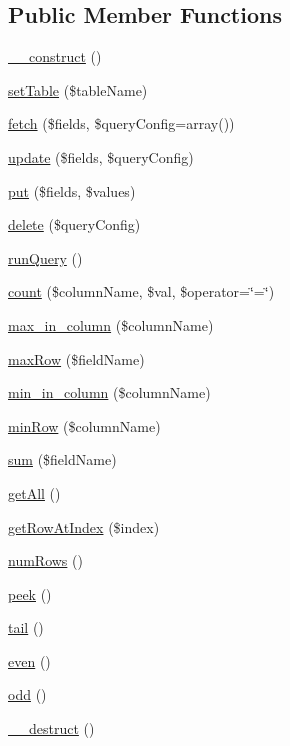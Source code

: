 \subsection*{Public Member Functions}
\begin{DoxyCompactItemize}
\item 
\hyperlink{class_linda_a095c5d389db211932136b53f25f39685}{\+\_\+\+\_\+construct} ()
\item 
\hyperlink{class_linda_aaded27ecadbc8530b9b21cbb38dfa4a8}{set\+Table} (\$table\+Name)
\item 
\hyperlink{class_linda_a87d58413379d402e5dee4f5825b686fd}{fetch} (\$fields, \$query\+Config=array())
\item 
\hyperlink{class_linda_ac000dfba7a410bb147dc77571d1e2ed5}{update} (\$fields, \$query\+Config)
\item 
\hyperlink{class_linda_af5a8f159a27ca700aa869092a5696be1}{put} (\$fields, \$values)
\item 
\hyperlink{class_linda_a8a141e762ceb79165d9a049eaa718d38}{delete} (\$query\+Config)
\item 
\hyperlink{class_linda_ad2e4fa0b57c9acdf15cd932346381af5}{run\+Query} ()
\item 
\hyperlink{class_linda_a3292920004f4f0eb71524e2e871fd9cc}{count} (\$column\+Name, \$val, \$operator=\char`\"{}=\char`\"{})
\item 
\hyperlink{class_linda_a9405f06abe08887d915b8c0a98885cb2}{max\+\_\+in\+\_\+column} (\$column\+Name)
\item 
\hyperlink{class_linda_ace93ec905a1eba8f431c1d6bb279ac20}{max\+Row} (\$field\+Name)
\item 
\hyperlink{class_linda_a47a8d3c75c7454aca40d3b7808465ab6}{min\+\_\+in\+\_\+column} (\$column\+Name)
\item 
\hyperlink{class_linda_a94e9b7b94a61bc48ad5d866bc93670ce}{min\+Row} (\$column\+Name)
\item 
\hyperlink{class_linda_ab39eb2457d23f38ac50e0af64a55f6e9}{sum} (\$field\+Name)
\item 
\hyperlink{class_linda_aba0d5b303383fb5b1fabb5fd01cd3800}{get\+All} ()
\item 
\hyperlink{class_linda_a15fff7e5f77cd6a7e7656e3e46b20a5c}{get\+Row\+At\+Index} (\$index)
\item 
\hyperlink{class_linda_af37433a300db1f607ee789d22828a0a0}{num\+Rows} ()
\item 
\hyperlink{class_linda_af0d2b98b49496eaef856a5b277fa775b}{peek} ()
\item 
\hyperlink{class_linda_a45fd7828ad0376368f5c32b64d5dbac4}{tail} ()
\item 
\hyperlink{class_linda_a046b5f5e8b171d4724f2780303239825}{even} ()
\item 
\hyperlink{class_linda_a666c4ea82d473f0e68ad97e3f33d1e83}{odd} ()
\item 
\hyperlink{class_linda_a421831a265621325e1fdd19aace0c758}{\+\_\+\+\_\+destruct} ()
\end{DoxyCompactItemize}
